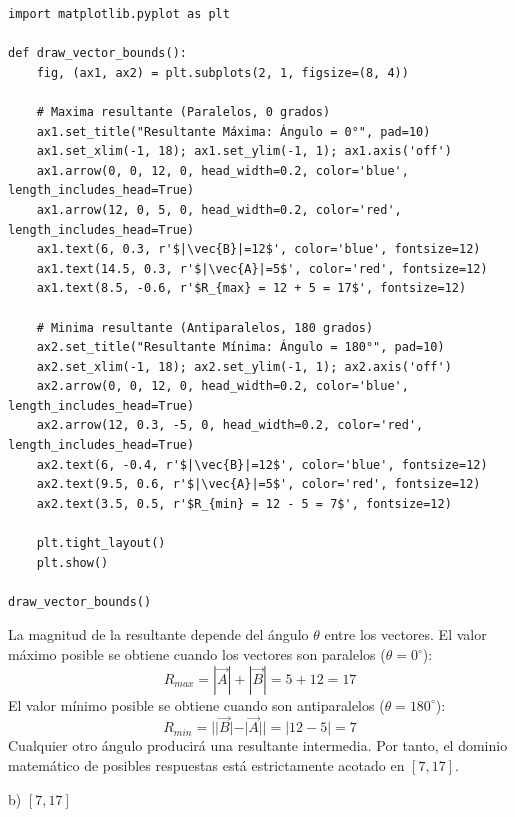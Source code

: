 \documentclass[12pt, a4paper]{article}
\begin{document}
\begin{lstlisting}
import matplotlib.pyplot as plt

def draw_vector_bounds():
    fig, (ax1, ax2) = plt.subplots(2, 1, figsize=(8, 4))
    
    # Maxima resultante (Paralelos, 0 grados)
    ax1.set_title("Resultante Máxima: Ángulo = 0°", pad=10)
    ax1.set_xlim(-1, 18); ax1.set_ylim(-1, 1); ax1.axis('off')
    ax1.arrow(0, 0, 12, 0, head_width=0.2, color='blue', length_includes_head=True)
    ax1.arrow(12, 0, 5, 0, head_width=0.2, color='red', length_includes_head=True)
    ax1.text(6, 0.3, r'$|\vec{B}|=12$', color='blue', fontsize=12)
    ax1.text(14.5, 0.3, r'$|\vec{A}|=5$', color='red', fontsize=12)
    ax1.text(8.5, -0.6, r'$R_{max} = 12 + 5 = 17$', fontsize=12)

    # Minima resultante (Antiparalelos, 180 grados)
    ax2.set_title("Resultante Mínima: Ángulo = 180°", pad=10)
    ax2.set_xlim(-1, 18); ax2.set_ylim(-1, 1); ax2.axis('off')
    ax2.arrow(0, 0, 12, 0, head_width=0.2, color='blue', length_includes_head=True)
    ax2.arrow(12, 0.3, -5, 0, head_width=0.2, color='red', length_includes_head=True)
    ax2.text(6, -0.4, r'$|\vec{B}|=12$', color='blue', fontsize=12)
    ax2.text(9.5, 0.6, r'$|\vec{A}|=5$', color='red', fontsize=12)
    ax2.text(3.5, 0.5, r'$R_{min} = 12 - 5 = 7$', fontsize=12)

    plt.tight_layout()
    plt.show()

draw_vector_bounds()
\end{lstlisting}

La magnitud de la resultante depende del ángulo $\theta$ entre los vectores. 
El valor máximo posible se obtiene cuando los vectores son paralelos ($\theta = 0^\circ$):
$$ R_{max} = |\vec{A}| + |\vec{B}| = 5 + 12 = 17 $$
El valor mínimo posible se obtiene cuando son antiparalelos ($\theta = 180^\circ$):
$$ R_{min} = | |\vec{B}| - |\vec{A}| | = |12 - 5| = 7 $$
Cualquier otro ángulo producirá una resultante intermedia. Por tanto, el dominio matemático de posibles respuestas está estrictamente acotado en $[7, 17]$.

\begin{tcolorbox}[colback=green!5!white, colframe=green!50!black, title=Respuesta Final]
\centering \Large b) $[7, 17]$
\end{tcolorbox}

\newpage

\end{document}
